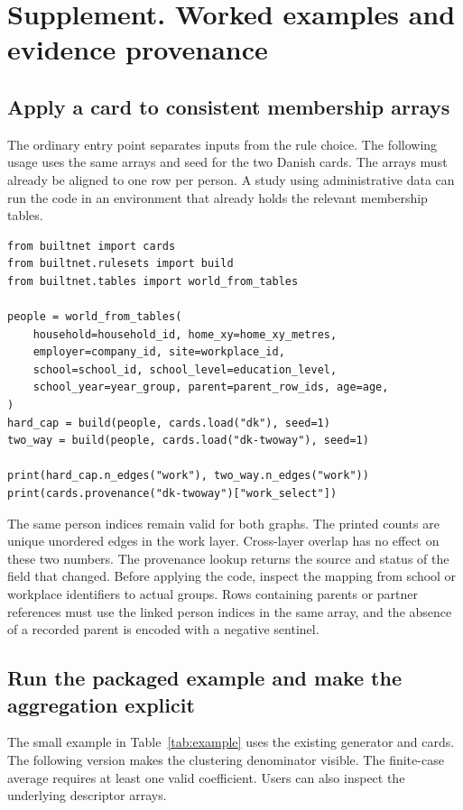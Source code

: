 \section{Supplement. Worked examples and evidence provenance}\label{sec:provenance}

\subsection{Apply a card to consistent membership arrays}

The ordinary entry point separates inputs from the rule choice. The following usage uses the same arrays and seed for the two Danish cards. The arrays must already be aligned to one row per person. A study using administrative data can run the code in an environment that already holds the relevant membership tables.

\begin{lstlisting}
from builtnet import cards
from builtnet.rulesets import build
from builtnet.tables import world_from_tables

people = world_from_tables(
    household=household_id, home_xy=home_xy_metres,
    employer=company_id, site=workplace_id,
    school=school_id, school_level=education_level,
    school_year=year_group, parent=parent_row_ids, age=age,
)
hard_cap = build(people, cards.load("dk"), seed=1)
two_way = build(people, cards.load("dk-twoway"), seed=1)

print(hard_cap.n_edges("work"), two_way.n_edges("work"))
print(cards.provenance("dk-twoway")["work_select"])
\end{lstlisting}

The same person indices remain valid for both graphs. The printed counts are unique unordered edges in the work layer. Cross-layer overlap has no effect on these two numbers. The provenance lookup returns the source and status of the field that changed. Before applying the code, inspect the mapping from school or workplace identifiers to actual groups. Rows containing parents or partner references must use the linked person indices in the same array, and the absence of a recorded parent is encoded with a negative sentinel.

\subsection{Run the packaged example and make the aggregation explicit}

The small example in Table~\ref{tab:example} uses the existing generator and cards. The following version makes the clustering denominator visible. The finite-case average requires at least one valid coefficient. Users can also inspect the underlying descriptor arrays.

